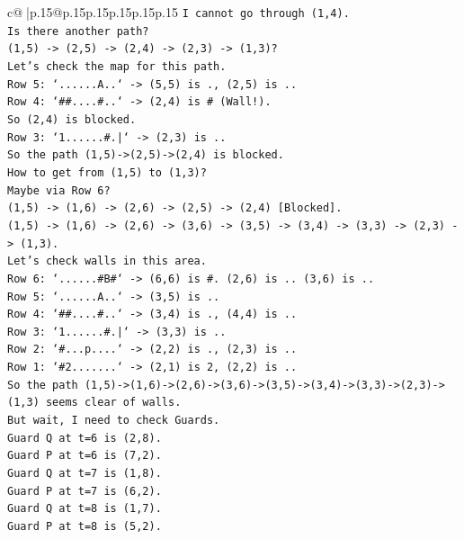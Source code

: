 \documentclass{article}
\begin{document}
{\begin{supertabular}{c@{$\;$}|p{.15\linewidth}@{}p{.15\linewidth}p{.15\linewidth}p{.15\linewidth}p{.15\linewidth}p{.15\linewidth}}
{{{\texttt{I cannot go through (1,4).} \\
\texttt{Is there another path?} \\
\texttt{(1,5) {-}> (2,5) {-}> (2,4) {-}> (2,3) {-}> (1,3)?} \\
\texttt{Let's check the map for this path.} \\
\texttt{Row 5: `......A..` {-}> (5,5) is ., (2,5) is ..} \\
\texttt{Row 4: `\#\#....\#..` {-}> (2,4) is \# (Wall!).} \\
\texttt{So (2,4) is blocked.} \\
\texttt{Row 3: `1......\#.|` {-}> (2,3) is ..} \\
\texttt{So the path (1,5){-}>(2,5){-}>(2,4) is blocked.} \\
\texttt{How to get from (1,5) to (1,3)?} \\
\texttt{Maybe via Row 6?} \\
\texttt{(1,5) {-}> (1,6) {-}> (2,6) {-}> (2,5) {-}> (2,4) {[}Blocked{]}.} \\
\texttt{(1,5) {-}> (1,6) {-}> (2,6) {-}> (3,6) {-}> (3,5) {-}> (3,4) {-}> (3,3) {-}> (2,3) {-}> (1,3).} \\
\texttt{Let's check walls in this area.} \\
\texttt{Row 6: `......\#B\#` {-}> (6,6) is \#. (2,6) is .. (3,6) is ..} \\
\texttt{Row 5: `......A..` {-}> (3,5) is ..} \\
\texttt{Row 4: `\#\#....\#..` {-}> (3,4) is ., (4,4) is ..} \\
\texttt{Row 3: `1......\#.|` {-}> (3,3) is ..} \\
\texttt{Row 2: `\#...p....` {-}> (2,2) is ., (2,3) is ..} \\
\texttt{Row 1: `\#2.......` {-}> (2,1) is 2, (2,2) is ..} \\
\texttt{So the path (1,5){-}>(1,6){-}>(2,6){-}>(3,6){-}>(3,5){-}>(3,4){-}>(3,3){-}>(2,3){-}>(1,3) seems clear of walls.} \\
\texttt{But wait, I need to check Guards.} \\
\texttt{Guard Q at t=6 is (2,8).} \\
\texttt{Guard P at t=6 is (7,2).} \\
\texttt{Guard Q at t=7 is (1,8).} \\
\texttt{Guard P at t=7 is (6,2).} \\
\texttt{Guard Q at t=8 is (1,7).} \\
\texttt{Guard P at t=8 is (5,2).} \\
}}}
\end{supertabular}}
\end{document}
